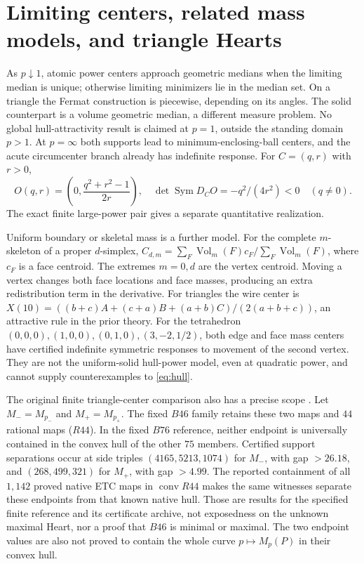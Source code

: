 \documentclass[11pt]{article}
\theoremstyle{definition}
\newcommand{\Sym}{\operatorname{Sym}}
\newcommand{\conv}{\operatorname{conv}}
\newcommand{\Vol}{\operatorname{Vol}}
\newcommand{\pn}{p_{-}}
\newcommand{\pp}{p_{+}}
\begin{document}
\section{Limiting centers, related mass models, and triangle Hearts}
As $p\downarrow1$, atomic power centers approach geometric medians when
the limiting median is unique; otherwise limiting minimizers lie in the
median set. On a triangle the Fermat construction is piecewise, depending
on its angles. The solid counterpart is a volume geometric median, a
different measure problem. No global hull-attractivity result is claimed
at $p=1$, outside the standing domain $p>1$.
At $p=\infty$ both supports lead to minimum-enclosing-ball centers, and
the acute circumcenter branch already has indefinite response. For
$C=(q,r)$ with $r>0$,
\[
 O(q,r)=\left(0,\frac{q^2+r^2-1}{2r}\right),\quad
 \det\Sym D_CO=-q^2/(4r^2)<0\quad(q\ne0).
\]
The exact finite large-power pair gives a separate quantitative realization.

Uniform boundary or skeletal mass is a further model. For the complete
$m$-skeleton of a proper $d$-simplex,
$C_{d,m}=\sum_F\Vol_m(F)c_F/\sum_F\Vol_m(F)$, where $c_F$ is a face
centroid. The extremes $m=0,d$ are the vertex centroid. Moving a vertex
changes both face locations and face masses, producing an extra
redistribution term in the derivative. For triangles the wire center is
$X(10)=((b+c)A+(c+a)B+(a+b)C)/(2(a+b+c))$, an attractive rule in the
prior theory. For the tetrahedron
$(0,0,0),(1,0,0),(0,1,0),(3,-2,1/2)$, both edge and face mass centers
have certified indefinite symmetric responses to movement of the second
vertex. They are not the uniform-solid hull-power model, even at quadratic
power, and cannot supply counterexamples to \eqref{eq:hull}.

The original finite triangle-center comparison also has a precise scope
\cite{PaperIII,Handoff}. Let $M_-=M_{\pn}$ and $M_+=M_{\pp}$.
The fixed $B46$ family retains these two maps and $44$ rational maps
($R44$). In the fixed $B76$ reference, neither endpoint is universally
contained in the convex hull of the other $75$ members. Certified support
separations occur at side triples $(4165,5213,1074)$ for $M_-$, with gap
$>26.18$, and $(268,499,321)$ for $M_+$, with gap $>4.99$.
The reported containment of all $1{,}142$ proved native ETC maps in
$\conv R44$ makes the same witnesses separate these endpoints from
that known native hull. Those are results for the specified finite
reference and its certificate archive, not exposedness on the unknown
maximal Heart, nor a proof that $B46$ is minimal or maximal.
The two endpoint values are also not proved to contain the whole curve
$p\mapsto M_p(P)$ in their convex hull.
\end{document}
